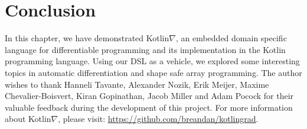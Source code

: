\section{Conclusion}

In this chapter, we have demonstrated Kotlin$\nabla$, an embedded domain specific language for differentiable programming and its implementation in the Kotlin programming language. Using our DSL as a vehicle, we explored some interesting topics in automatic differentiation and shape safe array programming. The author wishes to thank Hanneli Tavante, Alexander Nozik, Erik Meijer, Maxime Chevalier-Boisvert, Kiran Gopinathan, Jacob Miller and Adam Pocock for their valuable feedback during the development of this project. For more information about Kotlin$\nabla$, please visit: \url{https://github.com/breandan/kotlingrad}.
